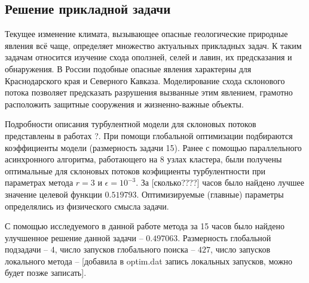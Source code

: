 \documentclass[11pt, oneside, a4paper]{article}
\begin{document}
\subsection{Решение прикладной задачи}

Текущее изменение климата, вызывающее опасные геологические природные явления всё чаще, определяет множество актуальных прикладных задач. К таким задачам относится изучение схода оползней, селей и лавин, их предсказания и обнаружения. В России подобные опасные явления характерны для Краснодарского края и Северного Кавказа. Моделирование схода склонового потока позволяет предсказать разрушения вызванные этим явлением, грамотно расположить защитные сооружения и жизненно-важные объекты. 

Подробности описания турбулентной модели для склоновых потоков представлены в работах \cite{} ?. При помощи глобальной оптимизации подбираются коэффициенты модели (размерность задачи 15). Ранее с помощью параллельного асинхронного алгоритма, работающего на 8 узлах кластера, были получены оптимальные для склоновых потоков коэфициенты турбулентности при параметрах метода  $r = 3$ и $\epsilon = 10^{-3}$. За [сколько????] часов было найдено лучшее значение целевой функции $0.519793$.
Оптимизируемые (главные) параметры определялись из физического смысла задачи.

С помощью исследуемого в данной работе метода за 15 часов было найдено улучшенное решение данной задачи -- $0.497063$. Размерность глобальной подзадачи -- $4$, число запусков глобального поиска -- $427$, число запусков локального метода -- [добавила в optim.dat запись локальных запусков, можно будет позже записать].
\end{document}
